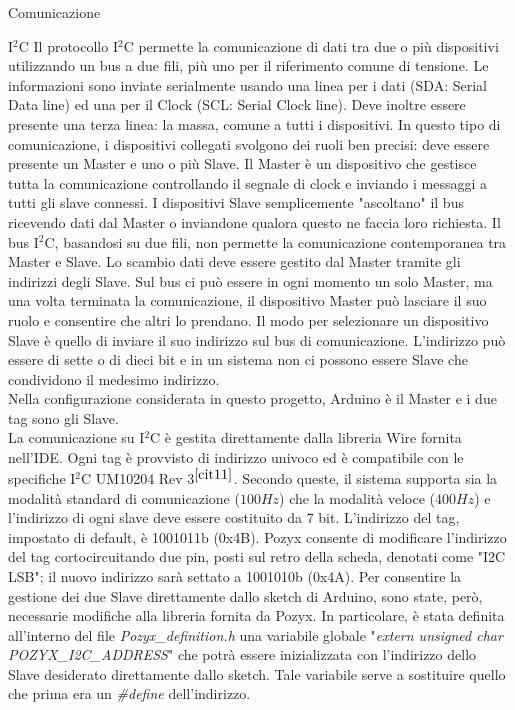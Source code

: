 \documentclass[12pt]{report}
\begin{document}
\begin{section}{Comunicazione}
\begin{subsection}{I$^{2}$C}
			Il protocollo I$^2$C permette la comunicazione di dati tra due o più dispositivi utilizzando un bus a due fili, più uno per il riferimento comune di tensione. Le informazioni sono inviate serialmente usando una linea per i dati (SDA: Serial Data line) ed una per il Clock (SCL: Serial Clock line). Deve inoltre essere 						presente una terza linea: la massa, comune a tutti i dispositivi. 
			In questo tipo di comunicazione, i dispositivi collegati svolgono dei ruoli ben precisi: deve essere presente un Master e uno o più Slave. Il Master è un dispositivo che gestisce tutta la comunicazione controllando il segnale di clock e inviando i messaggi a tutti gli slave connessi. I dispositivi Slave 											semplicemente "ascoltano" il bus ricevendo dati dal Master o inviandone qualora questo ne faccia loro richiesta. 
			Il bus I$^2$C, basandosi su due fili, non permette la comunicazione contemporanea tra Master e Slave. Lo scambio dati deve essere gestito dal Master tramite gli indirizzi degli Slave.
			Sul bus ci può essere in ogni momento un solo Master, ma una volta terminata la comunicazione, il dispositivo Master può lasciare il suo ruolo e consentire che altri lo prendano. Il modo per selezionare un dispositivo Slave è quello di inviare il suo indirizzo sul bus di comunicazione. L’indirizzo può essere di sette 				o di dieci bit e in un sistema non ci possono essere Slave che condividono il medesimo indirizzo. \\
			Nella configurazione considerata in questo progetto, Arduino è il Master e i due tag sono gli Slave.\\
			La comunicazione su I$^2$C è gestita direttamente dalla libreria Wire fornita nell’IDE. Ogni tag è provvisto di indirizzo univoco ed è compatibile con le specifiche I$^2$C UM10204 Rev 3$^{{\cite{cit11}}}$. Secondo queste, il sistema supporta sia la modalità standard di comunicazione ($100Hz$) che 								la modalità veloce ($400Hz$) e l’indirizzo di ogni slave deve essere costituito da 7 bit. 
			L’indirizzo del tag, impostato di default, è 1001011b (0x4B). Pozyx consente di modificare l'indirizzo del tag cortocircuitando due pin, posti sul retro della scheda, denotati come "I2C LSB"; il nuovo indirizzo sarà settato a 1001010b (0x4A). 
			Per consentire la gestione dei due Slave direttamente dallo sketch di Arduino, sono state, però, necessarie modifiche alla libreria fornita da Pozyx. In particolare, è stata definita all’interno del file \textit{Pozyx\_definition.h} una variabile globale "\textit{extern unsigned char POZYX\_I2C\_ADDRESS}" che potrà 					essere inizializzata con l’indirizzo dello Slave desiderato direttamente dallo sketch. Tale variabile serve a sostituire quello che prima era un \textit{\#define} dell'indirizzo.

\end{subsection}
\end{section}
\end{document}
